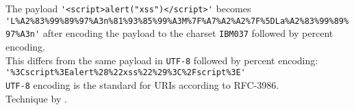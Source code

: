 The payload \verb|'<script>alert("xss")</script>'| becomes \\
\verb|'L%A2%83%99%89%97%A3n%81%93%85%99%A3M%7F%A7%A2%A2%7F%5DLa%A2%83%99%89%97%A3n'|
after encoding the payload to the charset \verb|IBM037| followed by percent encoding. \\
This differs from the same payload in \verb|UTF-8| followed by percent encoding: \\
\verb|'%3Cscript%3Ealert%28%22xss%22%29%3C%2Fscript%3E'| \\
\verb|UTF-8| encoding is the standard for URIs according to RFC-3986. \cite{rfc3986} \\
Technique by \cite{medium/allypetitt}.
